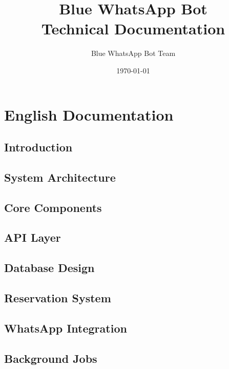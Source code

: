 \documentclass[12pt,a4paper]{report}
\title{
    \Huge\textbf{Blue WhatsApp Bot}\\[0.5cm]
    \Large Technical Documentation
}
\author{Blue WhatsApp Bot Team}
\date{\today}
\begin{document}
\maketitle

\tableofcontents
\listoffigures
\listoftables

\part{English Documentation}

\chapter{Introduction}


\chapter{System Architecture}


\chapter{Core Components}


\chapter{API Layer}


\chapter{Database Design}


\chapter{Reservation System}


\chapter{WhatsApp Integration}


\chapter{Background Jobs}

\end{document}
